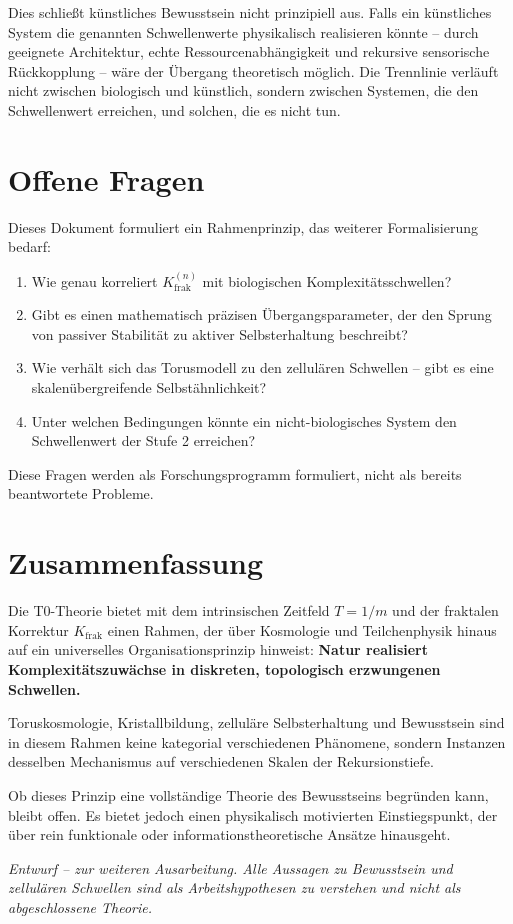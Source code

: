 	Dies schließt künstliches Bewusstsein nicht prinzipiell aus. Falls ein künstliches System die genannten Schwellenwerte physikalisch realisieren könnte -- durch geeignete Architektur, echte Ressourcenabhängigkeit und rekursive sensorische Rückkopplung -- wäre der Übergang theoretisch möglich. Die Trennlinie verläuft nicht zwischen biologisch und künstlich, sondern zwischen Systemen, die den Schwellenwert erreichen, und solchen, die es nicht tun.
	
	\section{Offene Fragen}
	
	Dieses Dokument formuliert ein Rahmenprinzip, das weiterer Formalisierung bedarf:
	\begin{enumerate}
		\item Wie genau korreliert $K_{\text{frak}}^{(n)}$ mit biologischen Komplexitätsschwellen?
		\item Gibt es einen mathematisch präzisen Übergangsparameter, der den Sprung von passiver Stabilität zu aktiver Selbsterhaltung beschreibt?
		\item Wie verhält sich das Torusmodell zu den zellulären Schwellen -- gibt es eine skalenübergreifende Selbstähnlichkeit?
		\item Unter welchen Bedingungen könnte ein nicht-biologisches System den Schwellenwert der Stufe 2 erreichen?
	\end{enumerate}
	
	Diese Fragen werden als Forschungsprogramm formuliert, nicht als bereits beantwortete Probleme.
	
	\section{Zusammenfassung}
	
	Die T0-Theorie bietet mit dem intrinsischen Zeitfeld $T = 1/m$ und der fraktalen Korrektur $K_{\text{frak}}$ einen Rahmen, der über Kosmologie und Teilchenphysik hinaus auf ein universelles Organisationsprinzip hinweist: \textbf{Natur realisiert Komplexitätszuwächse in diskreten, topologisch erzwungenen Schwellen.}
	
	Toruskosmologie, Kristallbildung, zelluläre Selbsterhaltung und Bewusstsein sind in diesem Rahmen keine kategorial verschiedenen Phänomene, sondern Instanzen desselben Mechanismus auf verschiedenen Skalen der Rekursionstiefe.
	
	Ob dieses Prinzip eine vollständige Theorie des Bewusstseins begründen kann, bleibt offen. Es bietet jedoch einen physikalisch motivierten Einstiegspunkt, der über rein funktionale oder informationstheoretische Ansätze hinausgeht.
	
	\vspace{1cm}
	\noindent
	\textit{Entwurf -- zur weiteren Ausarbeitung. Alle Aussagen zu Bewusstsein und zellulären Schwellen sind als Arbeitshypothesen zu verstehen und nicht als abgeschlossene Theorie.}
